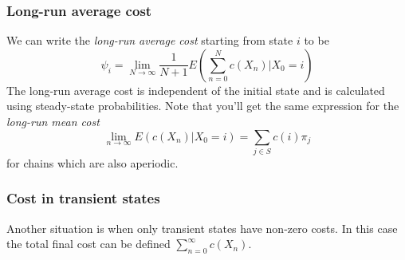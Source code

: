 \documentclass[11pt,a4paper]{article}
\begin{document}
\subsubsection{Long-run average cost}
We can write the \emph{long-run average cost} starting from state $i$ to be
$$\psi_i = \lim_{N \to \infty} \frac{1}{N+1} E\left( \sum_{n=0}^N c(X_n) | X_0 = i \right)$$
The long-run average cost is independent of the initial state and is calculated using steady-state probabilities.
Note that you'll get the same expression for the \emph{long-run mean cost}
$$\lim_{n \to \infty} E(c(X_n)|X_0=i) = \sum_{j \in S}c(i)\pi_j$$
for chains which are also aperiodic.

\subsubsection{Cost in transient states}
Another situation is when only transient states have non-zero costs.
In this case the total final cost can be defined $\sum_{n=0}^\infty c(X_n)$.
\end{document}
